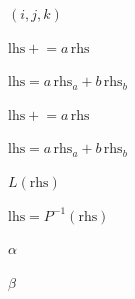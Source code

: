 \documentclass{article}
\begin{document}
$(i,j,k)$
\pagebreak

$\text{lhs} \mathrel{+}= a\,\text{rhs}$
\pagebreak

$\text{lhs} = a\,\text{rhs}_a + b\,\text{rhs}_b$
\pagebreak

$ \text{lhs} \mathrel{+}= a\,\text{rhs}$
\pagebreak

$ \text{lhs} = a\,\text{rhs}_a + b\,\text{rhs}_b$
\pagebreak

$L(\text{rhs})$
\pagebreak

$\text{lhs} = P^{-1}(\text{rhs})$
\pagebreak

$\alpha$
\pagebreak

$\beta$
\pagebreak
\end{document}
